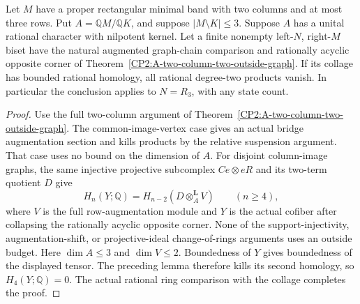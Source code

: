 \begin{theorem}
\label{CP2:A-local-three-outside-row-graph}
Let $M$ have a proper rectangular minimal band with two columns
and at most three rows.  Put $A=\mathbb QM/\mathbb QK$, and
suppose $|M\setminus K|\le3$.
Suppose $A$ has a unital rational character with nilpotent kernel.
Let a finite nonempty left-$N$, right-$M$ biset have the natural
augmented graph-chain comparison and rationally acyclic opposite
corner of Theorem~\ref{CP2:A-two-column-two-outside-graph}.
If its collage has bounded rational homology, all rational
degree-two products vanish.
In particular the conclusion applies to $N=R_3$, with any state count.
\end{theorem}
\begin{proof}
Use the full two-column argument of
Theorem~\ref{CP2:A-two-column-two-outside-graph}.
The common-image-vertex case gives an actual bridge augmentation
section and kills products by the relative suspension argument.
That case uses no bound on the dimension of $A$.
For disjoint column-image graphs, the same injective projective
subcomplex $Ce\otimes eR$ and its two-term quotient $D$ give
\[
 H_n(Y;\mathbb Q)=H_{n-2}(D\otimes_A^{\mathbf L}V)
 \qquad(n\ge4),
\]
where $V$ is the full row-augmentation module and $Y$ is the
actual cofiber after collapsing the rationally acyclic opposite
corner.  None of the support-injectivity, augmentation-shift,
or projective-ideal change-of-rings arguments uses an outside
budget.  Here $\dim A\le3$ and $\dim V\le2$.
Boundedness of $Y$ gives boundedness of the displayed tensor.
The preceding lemma therefore kills its second homology,
so $H_4(Y;\mathbb Q)=0$.  The actual rational ring comparison
with the collage completes the proof.
\end{proof}
